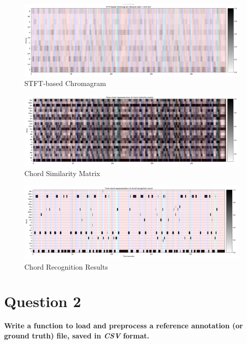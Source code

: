 \documentclass[
	12pt, %
]{fphw}
\begin{document}
\begin{figure}[H]
 \centering
 \includegraphics[scale=1]{./images/1_stft_chromagram.png}
 \caption{STFT-based Chromagram}
\end{figure}

\begin{figure}[H]
 \centering
 \includegraphics[scale=1]{./images/1_chord_similarity.png}
 \caption{Chord Similarity Matrix}
\end{figure}

\begin{figure}[H]
 \centering
 \includegraphics[scale=1]{./images/1_recognition_results.png}
 \caption{Chord Recognition Results}
\end{figure}


\section*{\color{red}Question 2}

\begin{problem}
	\textbf{Write a function to load and preprocess a reference annotation (or ground truth) file, saved in \emph{CSV} format.}
\end{problem}
\end{document}
